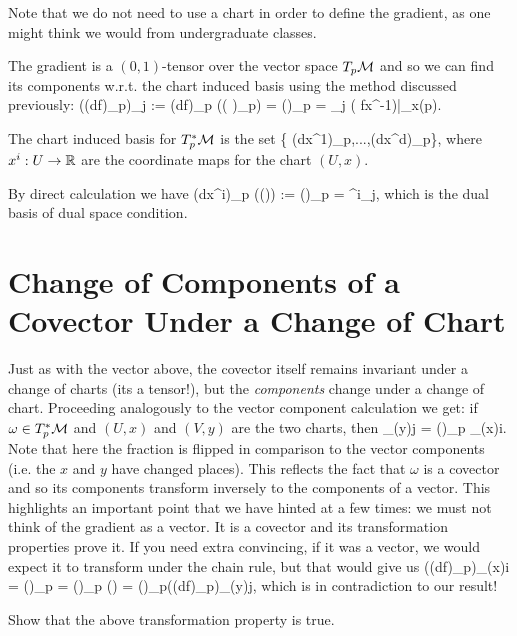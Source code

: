 \br 
    Note that we do not need to use a chart in order to define the gradient, as one might think we would from undergraduate classes. 
\er 

The gradient is a $(0,1)$-tensor over the vector space $T_p\mathcal{M}$ and so we can find its components w.r.t. the chart induced basis using the method discussed previously: 
\bse 
    \big((df)_p\big)_j := (df)_p \Bigg(\bigg(  \bigg)_p\Bigg) = \bigg(\bigg)_p = \p_j \big( f\circ x^{-1}\big)\big|_{x(p)}.
\ese 

\bc 
    The chart induced basis for $T^*_p\mathcal{M}$ is the set 
    \bse 
        \{ (dx^1)_p,...,(dx^d)_p\},
    \ese 
    where $x^i:U\to\mathbb{R}$ are the coordinate maps for the chart $(U,x)$.
\ec 

\bq 
    By direct calculation we have 
    \bse 
        (dx^i)_p \Bigg(\bigg(\bigg)\Bigg) := \bigg(\bigg)_p = \del^i_j,
    \ese 
    which is the dual basis of dual space condition. 
\eq 

\section{Change of Components of a Covector Under a Change of Chart}

Just as with the vector above, the covector itself remains invariant under a change of charts (its a tensor!), but the \textit{components} change under a change of chart. Proceeding analogously to the vector component calculation we get: if $\omega\in T^*_p\mathcal{M}$ and $(U,x)$ and $(V,y)$ are the two charts, then
\bse 
    \omega_{(y)j} = \bigg(\bigg)_p \omega_{(x)i}.
\ese
Note that here the fraction is flipped in comparison to the vector components (i.e. the $x$ and $y$ have changed places). This reflects the fact that $\omega$ is a covector and so its components transform inversely to the components of a vector. This highlights an important point that we have hinted at a few times: we must not think of the gradient as a vector. It is a covector and its transformation properties prove it. If you need extra convincing, if it was a vector, we would expect it to transform under the chain rule, but that would give us 
\bse 
    \big((df)_p\big)_{(x)i} = \bigg(\bigg)_p = \bigg(\bigg)_p \bigg(\bigg) = \bigg(\bigg)_p\big((df)_p\big)_{(y)j},
\ese 
which is in contradiction to our result!

\bbox 
    Show that the above transformation property is true. 
    
